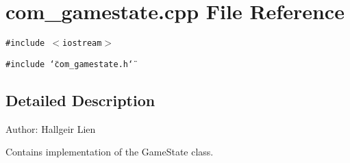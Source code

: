 \section{com\_\-gamestate.cpp File Reference}
\label{com__gamestate_8cpp}
{\tt \#include $<$iostream$>$}\par
{\tt \#include \char`\"{}com\_\-gamestate.h\char`\"{}}\par


\subsection{Detailed Description}
\begin{Desc}
\item[Author:]Hallgeir Lien\end{Desc}
Contains implementation of the GameState class. 